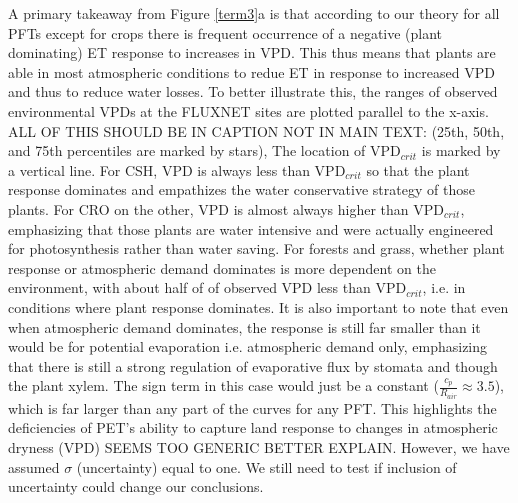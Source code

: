 \documentclass[draft,linenumbers]{agujournal}
\begin{document}
A primary takeaway from Figure \ref{term3}a is that according to our theory for all PFTs except for crops there is frequent occurrence of a negative (plant dominating) ET response to increases in VPD. This thus means that plants are able in most atmospheric conditions to redue ET in response to increased VPD and thus to reduce water losses. To better illustrate this, the ranges of observed environmental VPDs at the FLUXNET sites are plotted parallel to the x-axis. ALL OF THIS SHOULD BE IN CAPTION NOT IN MAIN TEXT: (25th, 50th, and 75th percentiles are marked by stars), 
The location of VPD$_{crit}$ is marked by a vertical line. For CSH, VPD is always less than VPD$_{crit}$ so that the plant response dominates and empathizes the water conservative strategy of those plants. For CRO on the other, VPD is almost always higher than VPD$_{crit}$, emphasizing that those plants are water intensive and were actually engineered for photosynthesis rather than water saving. For forests and grass, whether plant response or atmospheric demand dominates is more dependent on the environment, with about half of of observed VPD less than VPD$_{crit}$, i.e. in conditions where plant response dominates. It is also important to note that even when atmospheric demand dominates, the response is still far smaller than it would be for potential evaporation i.e. atmospheric demand only, emphasizing that there is still a strong regulation of evaporative flux by stomata and though the plant xylem. The sign term in this case would just be a constant ($\frac{c_p}{R_{air}} \approx 3.5$), which is far larger than any part of the curves for any PFT. This highlights the deficiencies of PET's ability to capture land response to changes in atmospheric dryness (VPD) SEEMS TOO GENERIC BETTER EXPLAIN. However, we have assumed $\sigma$ (uncertainty) equal to one. We still need to test if inclusion of uncertainty could change our conclusions.
\end{document}
